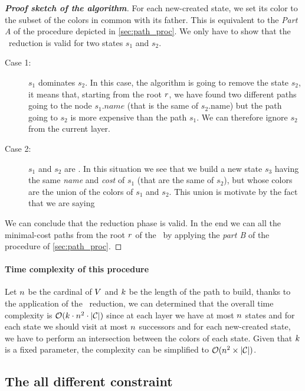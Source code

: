 \begin{proof}[\normalfont\textbf{Proof sketch of the algorithm}]
  For each new-created state, we set its color to the subset of the colors in common with its father. This is equivalent to the \textit{Part A} of the procedure depicted in \cref{sec:path_proc}. We only have to show that the \mdd\ reduction is valid for two states $s_1$ and $s_2$.
  \begin{description}
    \item[Case 1:] $s_1$ dominates $s_2$. In this case, the algorithm is going to remove the state $s_2$, it means that, starting from the root $r$, we have found two different paths going to the node $s_1\textit{.name}$ (that is the same of $s_2\text{.name}$) but the path going to $s_2$ is more expensive than the path $s_1$. We can therefore ignore $s_2$ from the current layer.
    \item[Case 2:] $s_1$ and $s_2$ are \compatibleState. In this situation we see that we build a new state $s_3$ having the same \textit{name} and \textit{cost} of $s_1$ (that are the same of $s_2$), but whose colors are the union of the colors of $s_1$ and $s_2$. This union is motivate by the fact that we are saying 
  \end{description}
  We can conclude that the reduction phase is valid. In the end we can all the minimal-cost paths from the root $r$ of the \mdd\ by applying the \textit{part B} of the procedure of \cref{sec:path_proc}.
\end{proof}

\paragraph{Time complexity of this procedure} Let $n$ be the cardinal of $V$ and $k$ be the length of the path to build, thanks to the application of the \mdd\ reduction, we can determined that the overall time complexity is $\mathcal{O}(k \cdot n^2 \cdot | \mathcal{C} |)$ since at each layer we have at most $n$ states and for each state we should visit at most $n$ successors and for each new-created state, we have to perform an intersection between the colors of each state. Given that $k$ is a fixed parameter, the complexity can be simplified to $\mathcal{O}(n^2 \times | \mathcal{C} |)$.

\subsection{The all different constraint}

